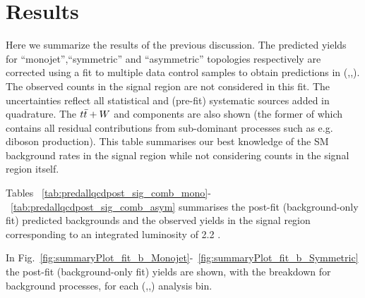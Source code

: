 \section{Results}
\label{sec:results}


Here we summarize the results of the previous discussion.  %
The predicted yields for ``monojet'',``symmetric'' and ``asymmetric'' topologies respectively are corrected using a fit to multiple data control samples to obtain predictions in (\nj,\nb,\scalht).  The observed counts in the signal region are not considered in this fit.  The uncertainties reflect all statistical and (pre-fit) systematic sources added in quadrature.  The $t\bar{t}+W$ and \znunu components are also shown (the former of which contains all residual contributions from sub-dominant processes such as e.g. diboson production).  This table summarises our best knowledge of the SM background rates in the signal region while not considering counts in the signal region itself. 


Tables ~\ref{tab:predallqcdpost_sig_comb_mono}-~\ref{tab:predallqcdpost_sig_comb_asym} summarises the post-fit (background-only fit) predicted backgrounds and the 
observed yields in the signal region corresponding to an integrated luminosity of 2.2 \ifb. 

In Fig.~\ref{fig:summaryPlot_fit_b_Monojet}-~\ref{fig:summaryPlot_fit_b_Symmetric} the post-fit (background-only fit) yields 
are shown, with the breakdown for background processes, for each (\njet,\nb,\scalht) analysis bin. 





